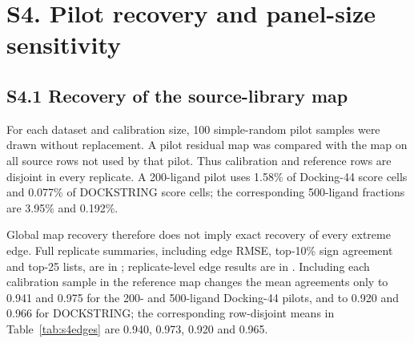 \documentclass[11pt]{article}
\begin{document}
\section*{S4. Pilot recovery and panel-size sensitivity}

\subsection*{S4.1 Recovery of the source-library map}

For each dataset and calibration size, 100 simple-random pilot samples were
drawn without replacement. A pilot residual map was compared with the map on
all source rows not used by that pilot. Thus calibration and reference rows are
disjoint in every replicate. A 200-ligand pilot uses 1.58\% of Docking-44 score
cells and 0.077\% of DOCKSTRING score cells; the corresponding 500-ligand
fractions are 3.95\% and 0.192\%.

\begin{table}[htbp]
\centering
\caption{Pilot recovery on row-disjoint complement maps. Entries are replicate
means with central 95\% repeated-sample ranges over 100 pilots. Top-edge
columns report precision for the ten most positive or ten most negative
reference edges.}
\label{tab:s4edges}
\small
{}
\end{table}

Global map recovery therefore does not imply exact recovery of every extreme
edge. Full replicate summaries, including edge RMSE, top-10\% sign agreement
and top-25 lists, are in
;
replicate-level edge results are in
.
Including each calibration sample in the reference map changes the mean
agreements only to 0.941 and 0.975 for the 200- and 500-ligand Docking-44
pilots, and to 0.920 and 0.966 for DOCKSTRING; the corresponding row-disjoint
means in Table~\ref{tab:s4edges} are 0.940, 0.973, 0.920 and 0.965.
\end{document}
